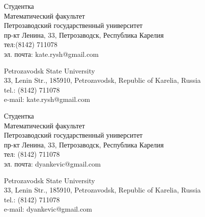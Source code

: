 \documentclass{article}
\begin{document}
\begin{aboutauthors}
Студентка\\ 
Математический факультет\\ 
Петрозаводский государственный университет\\
пр-кт Ленина, 33, Петрозаводск, Республика Карелия\\
тел:(8142) 711078\\
эл. почта: kate.rysh@gmail.com

\columnbreak

Petrozavodsk State University\\
33, Lenin Str., 185910, Petrozavodsk, Republic of Karelia, Russia\\
tel.: (8142) 711078\\
e-mail: kate.rysh@gmail.com 
\end{aboutauthors}

\begin{aboutauthors}
Студентка\\ 
Математический факультет\\ 
Петрозаводский государственный университет\\
пр-кт Ленина, 33, Петрозаводск, Республика Карелия\\
тел: (8142) 711078\\
эл. почта: dyankevic@gmail.com

\columnbreak

Petrozavodsk State University\\
33, Lenin Str., 185910, Petrozavodsk, Republic of Karelia, Russia\\
tel.: (8142) 711078\\
e-mail: dyankevic@gmail.com
\end{aboutauthors}
\end{document}
